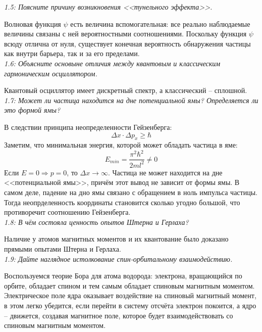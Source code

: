     \emph{1.5: Поясните причину возникновения <<тунельного эффекта>>.}
        
        Волновая функция \( \psi \) есть величина вспомогательная: 
        все реально наблюдаемые величины связаны с ней вероятностными
        соотношениями. Поскольку функция \( \psi \) всюду отлична от нуля, 
        существует конечная вероятность обнаружения частицы как внутри 
        барьера, так и за его пределами. \\

    \emph{1.6: Объясните основыне отличия между квантовым и классическим 
        гармоническим осциллятором.}
        
        Квантовый осциллятор имеет дискретный спектр, а классический -- 
        сплошной. \\

    \emph{1.7: Может ли частица находится на дне потенциальной ямы? 
    	Определяется ли это формой ямы?}

        В следствии принципа неопределенности Гейзенберга: 
        \[ \Delta x \cdot \Delta p_x \ge \hbar \]
        Заметим, что минимальная энергия, которой может обладать 
        частица в яме:
        \[ E_{min} = \frac{\pi^2\hbar^2}{2ml^2} \neq 0 \]
        Если \( E = 0 \Rightarrow p = 0 \), то 
        \( \Delta x \rightarrow \infty \). Частица не может находится
        на дне <<потенциальной ямы>>, причём этот вывод не зависит 
        от формы ямы. В самом деле, падение на дно ямы связано с 
        обращением в ноль импульса частицы. Тогда неопрделенность 
        координаты становится сколько угодно большой, что противоречит 
        соотношению Гейзенберга. \\
    
    \emph{1.8: В чём состояла ценность опытов Штерна и Герлаха?}

        Наличие у атомов магнитных моментов и их квантование было 
        доказано прямыми опытами Штерна и Герлаха. \\

    \emph{1.9: Дайте наглядное истолкование спин-орбитальному 
    	взаимодействию.}
        
        Воспользуемся теорие Бора для атома водорода: электрона, 
        вращающийся по орбите, обладает спином и тем самым обладает 
        спиновым магнитным моментом. Электрическое поле ядра оказывает 
        воздействие на спиновый магнитный момент, в этом легко 
        убедится, если перейти в систему отсчёта электрон покоится, а 
        ядро -- движется, создавая магнитное поле, которое будет 
        взаимодействовать со спиновым магнитным моментом. \\

